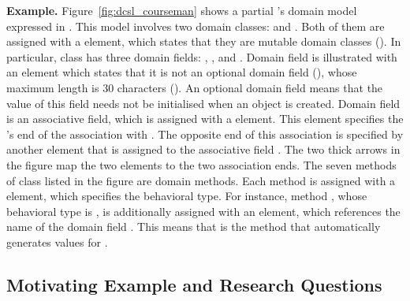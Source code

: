 
\noindent \textbf{Example.} Figure~\ref{fig:dcsl_courseman} shows a partial \courseman's domain model expressed in \dcsl. This model involves two domain classes:  and . 
Both of them are assigned with a  element, which states that they are mutable domain classes (). In particular, class  has three domain fields: , , and . Domain field  is illustrated with an  element which states that it is not an optional domain field (), whose maximum length is 30 characters (). An optional domain field means that the value of this field needs not be initialised when an object is created. Domain field  is an associative field, which is assigned with a  element. This element specifies the 's end of the association with . The opposite end of this association is specified by another  element that is assigned to the associative field . The two thick arrows in the figure map the two  elements to the two association ends. 
%
The seven methods of class  listed in the figure are domain methods. Each method is assigned with a  element, which specifies the behavioral type. For instance, method , whose behavioral type is , is additionally assigned with an  element, which references the name of the domain field . This means that  is the method that automatically generates values for .

\subsection{Motivating Example and Research Questions} 
\label{sect:bg-courseman-eg}

